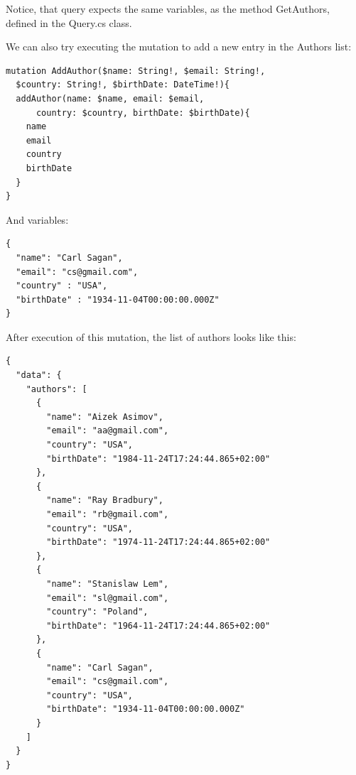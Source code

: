 Notice, that query expects the same variables, as the method GetAuthors, defined in the Query.cs class.

We can also try executing the mutation to add a new entry in the Authors list:

\begin{lstlisting}
mutation AddAuthor($name: String!, $email: String!,
  $country: String!, $birthDate: DateTime!){
  addAuthor(name: $name, email: $email,
      country: $country, birthDate: $birthDate){
    name
    email
    country
    birthDate
  }
}
\end{lstlisting}

And variables:

\begin{lstlisting}
{
  "name": "Carl Sagan",
  "email": "cs@gmail.com",
  "country" : "USA",
  "birthDate" : "1934-11-04T00:00:00.000Z"
}
\end{lstlisting}

After execution of this mutation, the list of authors looks like this:

\begin{lstlisting}
{
  "data": {
    "authors": [
      {
        "name": "Aizek Asimov",
        "email": "aa@gmail.com",
        "country": "USA",
        "birthDate": "1984-11-24T17:24:44.865+02:00"
      },
      {
        "name": "Ray Bradbury",
        "email": "rb@gmail.com",
        "country": "USA",
        "birthDate": "1974-11-24T17:24:44.865+02:00"
      },
      {
        "name": "Stanislaw Lem",
        "email": "sl@gmail.com",
        "country": "Poland",
        "birthDate": "1964-11-24T17:24:44.865+02:00"
      },
      {
        "name": "Carl Sagan",
        "email": "cs@gmail.com",
        "country": "USA",
        "birthDate": "1934-11-04T00:00:00.000Z"
      }
    ]
  }
}
\end{lstlisting}


\medskip

